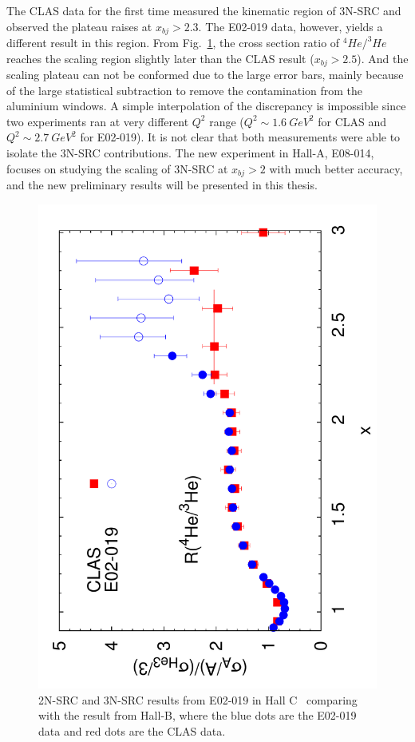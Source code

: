 The CLAS data for the first time measured the kinematic region of 3N-SRC and observed the plateau raises at $x_{bj}>2.3$. The E02-019 data, however, yields a different result in this region. From Fig.~\ref{E02019_2NSRC_3NSRC}, the cross section ratio of $^{4}He/^{3}He$ reaches the scaling region slightly later than the CLAS result ($x_{bj}>2.5$). And the scaling plateau can not be conformed due to the large error bars, mainly because of the large statistical subtraction to remove the contamination from the aluminium windows. A simple interpolation of the discrepancy is impossible since two experiments ran at very different $Q^{2}$ range ($Q^{2}\sim 1.6~GeV^{2}$ for CLAS and $Q^{2}\sim 2.7~GeV^{2}$ for E02-019). It is not clear that both measurements were able to isolate the 3N-SRC contributions. The new experiment in Hall-A, E08-014, focuses on studying the scaling of 3N-SRC at $x_{bj}>2$ with much better accuracy, and the new preliminary results will be presented in this thesis. 
\begin{figure}[!ht]
  \begin{center}
    \includegraphics[type=pdf,ext=.pdf,read=.pdf,width=0.60\linewidth]{./figures/physics/E02019_2NSRC_3NSRC}
    \caption[2N-SRC and 3N-SRC results from E02-019 in Hall C]{\footnotesize{2N-SRC and 3N-SRC results from E02-019 in Hall C~\cite{PhysRevLett.108.092502} comparing with the result from Hall-B, where the blue dots are the E02-019 data and red dots are the CLAS data.}}
    \label{E02019_2NSRC_3NSRC}
  \end{center}
\end{figure} 


